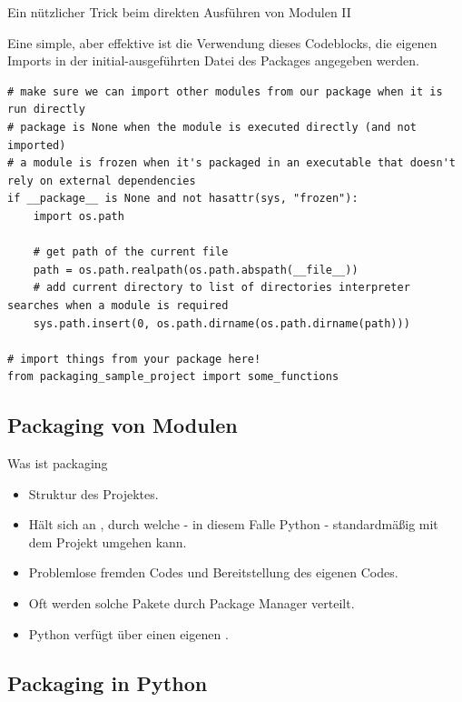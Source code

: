 \documentclass[12pt, aspectratio=169, usepdftitle=false]{beamer}
\newcommand{\pp}[1]{\lpl{#1}}
\begin{document}
\begin{frame}[fragile]{Ein nützlicher Trick beim direkten Ausführen von Modulen II}

Eine simple, aber effektive  ist die Verwendung dieses Codeblocks,  die eigenen Imports in der initial-ausgeführten Datei des Packages angegeben werden.
\pause


\begin{lstlisting}[language=pytiny]
# make sure we can import other modules from our package when it is run directly
# package is None when the module is executed directly (and not imported)
# a module is frozen when it's packaged in an executable that doesn't rely on external dependencies
if __package__ is None and not hasattr(sys, "frozen"):
    import os.path

    # get path of the current file
    path = os.path.realpath(os.path.abspath(__file__))
    # add current directory to list of directories interpreter searches when a module is required
    sys.path.insert(0, os.path.dirname(os.path.dirname(path)))

# import things from your package here!
from packaging_sample_project import some_functions
\end{lstlisting}
	
\end{frame}


\subsection{Packaging von Modulen}
\begin{frame}{Was ist packaging}
	\begin{itemize}
		\item {} Struktur des Projektes.
		\pause
		\item Hält sich an , durch welche - in diesem Falle Python - standardmäßig mit dem Projekt umgehen kann.
		\pause
		\item Problemlose  fremden Codes und Bereitstellung des eigenen Codes.
		\pause
		\item Oft werden solche Pakete durch Package Manager verteilt.
		\item[] Python verfügt über einen eigenen  \pp{pip}.
	\end{itemize}
	
\end{frame}

\subsection{Packaging in Python}
\end{document}
